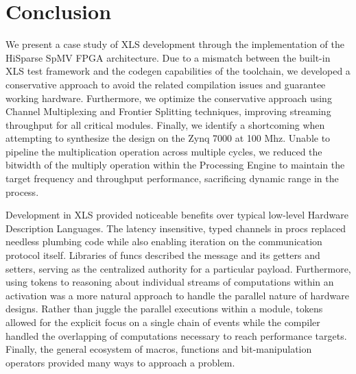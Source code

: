 \chapter{Conclusion}

We present a case study of XLS development through the implementation of the HiSparse SpMV FPGA architecture. Due to a mismatch between the built-in XLS test framework and the codegen capabilities of the toolchain, we developed a conservative approach to avoid the related compilation issues and guarantee working hardware. Furthermore, we optimize the conservative approach using Channel Multiplexing and Frontier Splitting techniques, improving streaming throughput for all critical modules. Finally, we identify a shortcoming when attempting to synthesize the design on the Zynq 7000 at 100 Mhz. Unable to pipeline the multiplication operation across multiple cycles, we reduced the bitwidth of the multiply operation within the Processing Engine to maintain the target frequency and throughput performance, sacrificing dynamic range in the process. 

Development in XLS provided noticeable benefits over typical low-level Hardware Description Languages. The latency insensitive, typed channels in procs replaced needless plumbing code while also enabling iteration on the communication protocol itself. Libraries of funcs described the message and its getters and setters, serving as the centralized authority for a particular payload. Furthermore, using tokens to reasoning about individual streams of computations within an activation was a more natural approach to handle the parallel nature of hardware designs. Rather than juggle the parallel executions within a module, tokens allowed for the explicit focus on a single chain of events while the compiler handled the overlapping of computations necessary to reach performance targets. Finally, the general ecosystem of macros, functions and bit-manipulation operators provided many ways to approach a problem.





